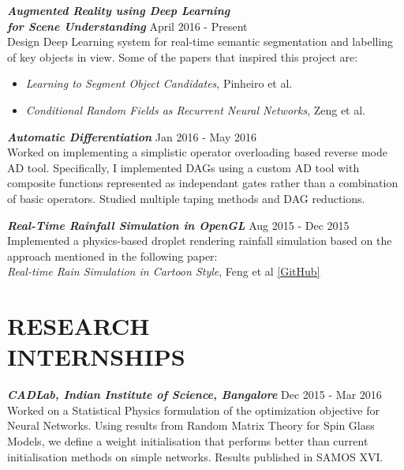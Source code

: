 \documentclass[margin, 10pt]{res} %
\begin{document}
\begin{resume}
{\sl \textbf{Augmented Reality using Deep Learning}} \\
{\sl \textbf{for Scene Understanding}} \hfill April 2016 - Present\\
Design Deep Learning system for real-time semantic segmentation and labelling of key objects in view. Some of the papers that inspired this project are:
\begin{itemize} \itemsep -2pt %
\item {\sl Learning to Segment Object Candidates}, Pinheiro et al.
\item {\sl Conditional Random Fields as Recurrent Neural Networks}, Zeng et al.
\end{itemize} 

{\sl \textbf{Automatic Differentiation}} \hfill Jan 2016 - May 2016 \\
Worked on implementing a simplistic operator overloading based reverse mode AD tool. Specifically, I implemented DAGs using a custom AD tool with composite functions represented as independant gates rather than a combination of basic operators. Studied multiple taping methods and DAG reductions.

{\sl \textbf{Real-Time Rainfall Simulation in OpenGL}} \hfill Aug 2015 - Dec 2015 \\
Implemented a physics-based droplet rendering rainfall simulation based on the approach mentioned in the following paper:\\
{\sl Real-time Rain Simulation in Cartoon Style}, Feng et al \href{https://arxiv.org/abs/1607.06011}{[GitHub]}

 
\section{RESEARCH \\ INTERNSHIPS}
{\sl \textbf{CADLab, Indian Institute of Science, Bangalore}} \hfill Dec 2015 - Mar 2016 \\
Worked on a Statistical Physics formulation of the optimization objective for Neural Networks. Using results from Random Matrix Theory for Spin Glass Models, we define a weight initialisation that performs better than current initialisation methods on simple networks. Results published in SAMOS XVI.


\end{resume}
\end{document}
